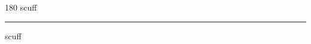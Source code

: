 
\begin{frame}
\begin{center}
\begin{turn}{180}
{\fontsize{2.5cm}{1em}\selectfont scuff}
\end{turn}
\vspace{1em}\par  
\hrule
\vspace{1em}\par  
{\fontsize{2.5cm}{1em}\selectfont scuff}
\end{center}
\end{frame}
